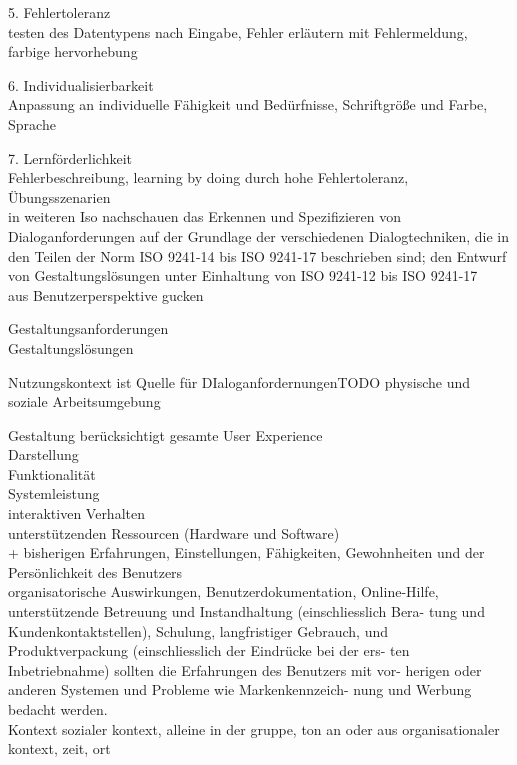  5. Fehlertoleranz\\
 	testen des Datentypens nach Eingabe, Fehler erläutern mit Fehlermeldung, farbige hervorhebung 

 6. Individualisierbarkeit\\
 	Anpassung an individuelle Fähigkeit und Bedürfnisse, Schriftgröße und Farbe, Sprache

 7. Lernförderlichkeit\\
 	Fehlerbeschreibung, learning by doing durch hohe Fehlertoleranz, Übungsszenarien\\

 	in weiteren Iso nachschauen
 	das Erkennen und Spezifizieren von Dialoganforderungen auf der Grundlage der verschiedenen Dialogtechniken, die in den Teilen der Norm ISO 9241-14 bis ISO 9241-17 beschrieben sind;
 den Entwurf von Gestaltungslösungen unter Einhaltung von ISO 9241-12 bis ISO 9241-17\\

 aus Benutzerperspektive gucken

 Gestaltungsanforderungen\\
 Gestaltungslösungen

 Nutzungskontext ist Quelle für DIaloganfordernungenTODO physische und soziale Arbeitsumgebung

 Gestaltung berücksichtigt gesamte User Experience\\
 Darstellung\\
 Funktionalität\\
 Systemleistung\\
 interaktiven Verhalten\\
 unterstützenden Ressourcen (Hardware und Software)\\
 + bisherigen Erfahrungen, Einstellungen, Fähigkeiten, Gewohnheiten und der Persönlichkeit des Benutzers\\

 organisatorische Auswirkungen, Benutzerdokumentation, Online-Hilfe, unterstützende Betreuung und Instandhaltung (einschliesslich Bera- tung und Kundenkontaktstellen), Schulung, langfristiger Gebrauch, und Produktverpackung (einschliesslich der Eindrücke bei der ers- ten Inbetriebnahme) sollten die Erfahrungen des Benutzers mit vor- herigen oder anderen Systemen und Probleme wie Markenkennzeich- nung und Werbung bedacht werden.\\

 Kontext sozialer kontext, alleine in der gruppe, ton an oder aus
 organisationaler kontext, zeit, ort


